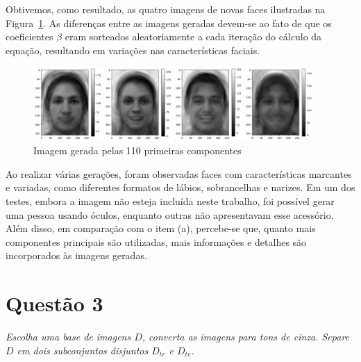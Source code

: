 \documentclass[a4paper, 11pt]{article}
\begin{document}
Obtivemos, como resultado, as quatro imagens de novas faces ilustradas na Figura~\ref{fig:ger}. As diferenças entre as imagens geradas devem-se ao fato de que os coeficientes $\beta$ eram sorteados aleatoriamente a cada iteração do cálculo da equação, resultando em variações nas características faciais.

\begin{figure} [H]
    \centering 
    \includegraphics[width=0.95\textwidth]{imgs/gerador.png}
    \caption{Imagem gerada pelas 110 primeiras componentes}
    \label{fig:ger} %
\end{figure}

Ao realizar várias gerações, foram observadas faces com características marcantes e variadas, como diferentes formatos de lábios, sobrancelhas e narizes. Em um dos testes, embora a imagem não esteja incluída neste trabalho, foi possível gerar uma pessoa usando óculos, enquanto outras não apresentavam esse acessório. Além disso, em comparação com o item (a), percebe-se que, quanto mais componentes principais são utilizadas, mais informações e detalhes são incorporados às imagens geradas.


\section{\textbf{Questão 3}}
\noindent \textit{Escolha uma base de imagens \( D \), converta as imagens para tons de cinza. Separe \( D \) em dois subconjuntos disjuntos \( D_{tr} \) e \( D_{te} \).}
\end{document}
